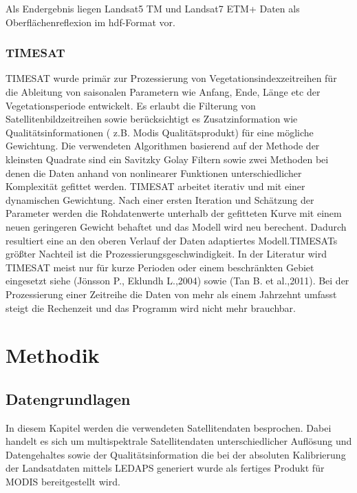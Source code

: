 \documentclass[11pt]{report}
\begin{document}
Als Endergebnis liegen Landsat5 TM und Landsat7 ETM+ Daten als Oberflächenreflexion im hdf-Format vor. 


\subsection{TIMESAT}
TIMESAT wurde primär zur Prozessierung von Vegetationsindexzeitreihen für die  Ableitung von saisonalen Parametern wie Anfang, Ende, Länge etc der Vegetationsperiode entwickelt. Es erlaubt die Filterung von Satellitenbildzeitreihen sowie berücksichtigt es Zusatzinformation wie Qualitätsinformationen ( z.B. Modis Qualitätsprodukt) für eine mögliche Gewichtung. Die verwendeten Algorithmen basierend auf der Methode der kleinsten Quadrate sind ein Savitzky Golay Filtern sowie zwei Methoden bei denen die Daten anhand von nonlinearer Funktionen unterschiedlicher Komplexität gefittet werden. TIMESAT arbeitet iterativ und mit einer dynamischen Gewichtung. Nach einer ersten Iteration und Schätzung der Parameter werden die Rohdatenwerte unterhalb der gefitteten Kurve mit einem neuen geringeren Gewicht behaftet und das Modell wird neu berechent. Dadurch resultiert eine an den oberen Verlauf der Daten adaptiertes Modell.TIMESATs größter Nachteil ist die Prozessierungsgeschwindigkeit. In der Literatur wird TIMESAT meist nur für kurze Perioden oder einem beschränkten Gebiet eingesetzt siehe (Jönsson P., Eklundh L.,2004) sowie (Tan B. et al.,2011). Bei der Prozessierung einer Zeitreihe die Daten von mehr als einem Jahrzehnt umfasst steigt die Rechenzeit und das Programm wird nicht mehr brauchbar. 


% 




\chapter{Methodik}

\section{Datengrundlagen}
In diesem Kapitel werden die verwendeten Satellitendaten besprochen. Dabei handelt es sich um multispektrale Satellitendaten unterschiedlicher Auflösung und Datengehaltes  sowie der Qualitätsinformation die bei der absoluten Kalibrierung der Landsatdaten mittels LEDAPS generiert wurde als fertiges Produkt für MODIS bereitgestellt wird. 
\end{document}
